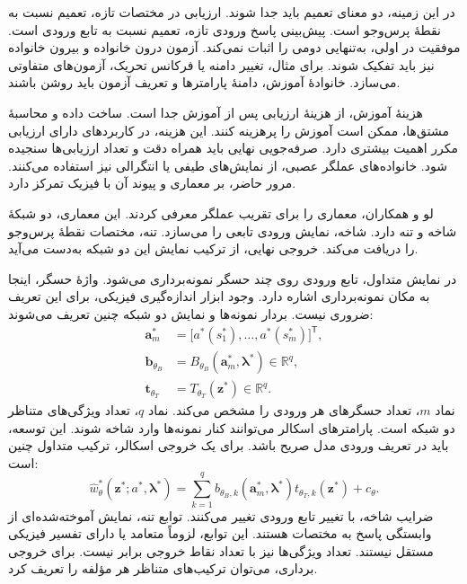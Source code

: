 در این زمینه، دو معنای تعمیم باید جدا شوند.
ارزیابی در مختصات تازه، تعمیم نسبت به نقطهٔ پرس‌وجو است.
پیش‌بینی پاسخ ورودی تازه، تعمیم نسبت به تابع ورودی است.
موفقیت در اولی، به‌تنهایی دومی را اثبات نمی‌کند.
آزمون درون خانواده و بیرون خانواده نیز باید تفکیک شوند.
برای مثال، تغییر دامنه یا فرکانس تحریک، آزمون‌های متفاوتی می‌سازد.
خانوادهٔ آموزش، دامنهٔ پارامترها و تعریف آزمون باید روشن باشند.

هزینهٔ آموزش، از هزینهٔ ارزیابی پس از آموزش جدا است.
ساخت داده و محاسبهٔ مشتق‌ها، ممکن است آموزش را پرهزینه کنند.
این هزینه، در کاربردهای دارای ارزیابی مکرر اهمیت بیشتری دارد.
صرفه‌جویی نهایی باید همراه دقت و تعداد ارزیابی‌ها سنجیده شود.
خانواده‌های عملگر عصبی، از نمایش‌های طیفی یا انتگرالی نیز استفاده می‌کنند.
مرور حاضر، بر معماری  و پیوند آن با فیزیک تمرکز دارد.
\cite{Kovachki2023NeuralOperator}

\label{sec:lit-deeponet-architecture}

لو و همکاران، معماری  را برای تقریب عملگر معرفی کردند.
این معماری، دو شبکهٔ شاخه و تنه دارد.
شاخه، نمایش ورودی تابعی را می‌سازد.
تنه، مختصات نقطهٔ پرس‌وجو را دریافت می‌کند.
خروجی نهایی، از ترکیب نمایش این دو شبکه به‌دست می‌آید.
\cite{lu2021deeponet}

در نمایش متداول، تابع ورودی روی چند حسگر نمونه‌برداری می‌شود.
واژهٔ حسگر، اینجا به مکان نمونه‌برداری اشاره دارد.
وجود ابزار اندازه‌گیری فیزیکی، برای این تعریف ضروری نیست.
بردار نمونه‌ها و نمایش دو شبکه چنین تعریف می‌شوند:
\begin{equation}
\begin{aligned}
\mathbf{a}^{*}_{m}
&=\big[a^{*}(s^{*}_{1}),\ldots,a^{*}(s^{*}_{m})\big]^{\mathsf T},\\
\mathbf{b}_{\theta_B}
&=B_{\theta_B}(\mathbf{a}^{*}_{m},\boldsymbol{\lambda}^{*})\in\mathbb{R}^{q},\\
\mathbf{t}_{\theta_T}
&=T_{\theta_T}(\mathbf{z}^{*})\in\mathbb{R}^{q}.
\end{aligned}
\label{eq:lit-branch-trunk-features}
\end{equation}
نماد $m$، تعداد حسگرهای هر ورودی را مشخص می‌کند.
نماد $q$، تعداد ویژگی‌های متناظر دو شبکه است.
پارامترهای اسکالر می‌توانند کنار نمونه‌ها وارد شاخه شوند.
این توسعه، باید در تعریف ورودی مدل صریح باشد.
برای یک خروجی اسکالر، ترکیب متداول چنین است:
\begin{equation}
\widehat{w}^{*}_{\theta}(\mathbf{z}^{*};a^{*},\boldsymbol{\lambda}^{*})
=\sum_{k=1}^{q}
b_{\theta_B,k}(\mathbf{a}^{*}_{m},\boldsymbol{\lambda}^{*})
t_{\theta_T,k}(\mathbf{z}^{*})+c_{\theta}.
\label{eq:lit-deeponet-contraction}
\end{equation}
ضرایب شاخه، با تغییر تابع ورودی تغییر می‌کنند.
توابع تنه، نمایش آموخته‌شده‌ای از وابستگی پاسخ به مختصات هستند.
این توابع، لزوماً متعامد یا دارای تفسیر فیزیکی مستقل نیستند.
تعداد ویژگی‌ها نیز با تعداد نقاط خروجی برابر نیست.
برای خروجی برداری، می‌توان ترکیب‌های متناظر هر مؤلفه را تعریف کرد.
\cite{lu2021deeponet}

